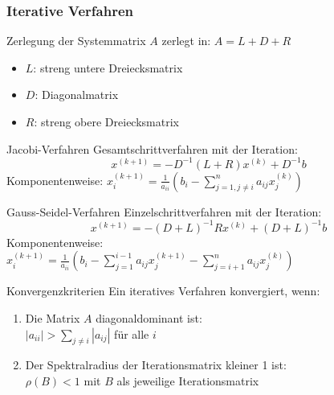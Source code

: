 \subsubsection{Iterative Verfahren}

\begin{definition}{Zerlegung der Systemmatrix} $A$ zerlegt in: $A = L + D + R$
\begin{itemize}
    \item $L$: streng untere Dreiecksmatrix
    \item $D$: Diagonalmatrix
    \item $R$: streng obere Dreiecksmatrix
\end{itemize}
\end{definition}

\begin{concept}{Jacobi-Verfahren}
Gesamtschrittverfahren mit der Iteration:
\vspace{-1mm}\\
$$x^{(k+1)} = -D^{-1}(L + R)x^{(k)} + D^{-1}b$$
\vspace{-1mm}
Komponentenweise:
$x_i^{(k+1)} = \frac{1}{a_{ii}}\left(b_i - \sum_{j=1,j\neq i}^n a_{ij}x_j^{(k)}\right)$
\end{concept}

\begin{concept}{Gauss-Seidel-Verfahren}
Einzelschrittverfahren mit der Iteration:
\vspace{-1mm}\\
$$x^{(k+1)} = -(D+L)^{-1}Rx^{(k)} + (D+L)^{-1}b$$
Komponentenweise:\\
$x_i^{(k+1)} = \frac{1}{a_{ii}}\left(b_i - \sum_{j=1}^{i-1} a_{ij}x_j^{(k+1)} - \sum_{j=i+1}^n a_{ij}x_j^{(k)}\right)$

\end{concept}

\begin{theorem}{Konvergenzkriterien}
Ein iteratives Verfahren konvergiert, wenn:
\begin{enumerate}
    \item Die Matrix $A$ diagonaldominant ist:\\
    $|a_{ii}| > \sum_{j\neq i} |a_{ij}|$ für alle $i$
    \item Der Spektralradius der Iterationsmatrix kleiner 1 ist:\\
    $\rho(B) < 1$ mit $B$ als jeweilige Iterationsmatrix
\end{enumerate}
\end{theorem}





